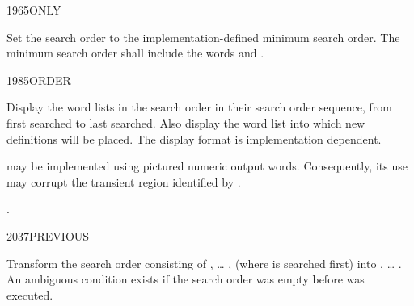 \begin{worddef}{1965}{ONLY}
\item \stack{}{}

	Set the search order to the implementation-defined minimum search
	order. The minimum search order shall include the words
	 and .
\end{worddef}


\begin{worddef}{1985}{ORDER}
\item \stack{}{}

	Display the word lists in the search order in their search order
	sequence, from first searched to last searched. Also display the
	word list into which new definitions will be placed. The display
	format is implementation dependent.

	 may be implemented using pictured numeric output
	words. Consequently, its use may corrupt the transient region
	identified by .

\see {}.
\end{worddef}


\begin{worddef}{2037}{PREVIOUS}
\item \stack{}{}

	Transform the search order consisting of , {\ldots}
	,  (where  is searched
	first) into , {\ldots} . An ambiguous
	condition exists if the search order was empty before
	 was executed.
\end{worddef}

